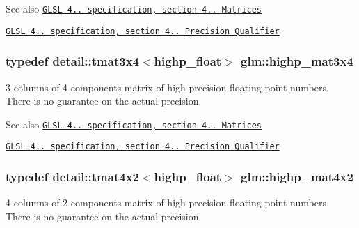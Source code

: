 \begin{DoxySeeAlso}{\-See also}
\href{http://www.opengl.org/registry/doc/GLSLangSpec.4.20.8.pdf}{\tt \-G\-L\-S\-L 4.. specification, section 4.. \-Matrices} 

\href{http://www.opengl.org/registry/doc/GLSLangSpec.4.20.8.pdf}{\tt \-G\-L\-S\-L 4.. specification, section 4.. \-Precision \-Qualifier} 
\end{DoxySeeAlso}
\hypertarget{group__core__precision_ga55fe92f6217fa20816f52f748fb399c7}{
\subsubsection[{highp\-\_\-mat3x4}]{\setlength{\rightskip}{0pt plus 5cm}typedef detail\-::tmat3x4$<$highp\-\_\-float$>$ {\bf glm\-::highp\-\_\-mat3x4}}}\label{group__core__precision_ga55fe92f6217fa20816f52f748fb399c7}
3 columns of 4 components matrix of high precision floating-\/point numbers. \-There is no guarantee on the actual precision.

\begin{DoxySeeAlso}{\-See also}
\href{http://www.opengl.org/registry/doc/GLSLangSpec.4.20.8.pdf}{\tt \-G\-L\-S\-L 4.. specification, section 4.. \-Matrices} 

\href{http://www.opengl.org/registry/doc/GLSLangSpec.4.20.8.pdf}{\tt \-G\-L\-S\-L 4.. specification, section 4.. \-Precision \-Qualifier} 
\end{DoxySeeAlso}
\hypertarget{group__core__precision_gaea696a76cb6e8c9b85ee9f0fd2e38a05}{
\subsubsection[{highp\-\_\-mat4x2}]{\setlength{\rightskip}{0pt plus 5cm}typedef detail\-::tmat4x2$<$highp\-\_\-float$>$ {\bf glm\-::highp\-\_\-mat4x2}}}\label{group__core__precision_gaea696a76cb6e8c9b85ee9f0fd2e38a05}
4 columns of 2 components matrix of high precision floating-\/point numbers. \-There is no guarantee on the actual precision.

